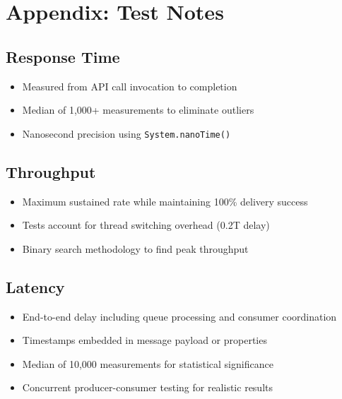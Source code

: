 \documentclass[11pt,a4paper]{article}
\begin{document}
\newpage
\appendix
\section{Appendix: Test Notes}

\subsection{Response Time}
\begin{itemize}[leftmargin=*,nosep]
    \item Measured from API call invocation to completion
    \item Median of 1,000+ measurements to eliminate outliers
    \item Nanosecond precision using \texttt{System.nanoTime()}
\end{itemize}

\subsection{Throughput}
\begin{itemize}[leftmargin=*,nosep]
    \item Maximum sustained rate while maintaining 100\% delivery success
    \item Tests account for thread switching overhead (0.2T delay)
    \item Binary search methodology to find peak throughput
\end{itemize}

\subsection{Latency}
\begin{itemize}[leftmargin=*,nosep]
    \item End-to-end delay including queue processing and consumer coordination
    \item Timestamps embedded in message payload or properties
    \item Median of 10,000 measurements for statistical significance
    \item Concurrent producer-consumer testing for realistic results
\end{itemize}
\end{document}
